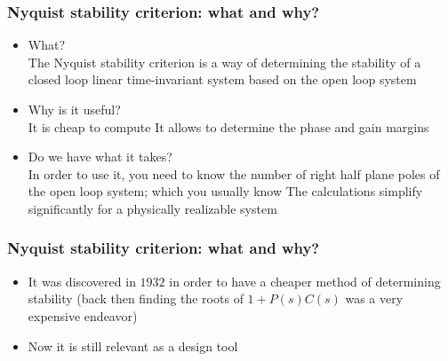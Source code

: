 \begin{frame}
\frametitle{Nyquist stability criterion: what and why?}
\begin{itemize}
\vspace{-0.25cm}
\item What?\\
\vspace{0.35cm}
The Nyquist stability criterion is a way of determining the stability of a closed loop linear time-invariant system based on the open loop system
\vspace{0.25cm}
\item Why is it useful?\\
\vspace{0.35cm}
It is cheap to compute
It allows to determine the phase and gain margins
\vspace{0.25cm}
\item Do we have what it takes?\\
\vspace{0.35cm}
In order to use it, you need to know the number of right half plane poles of the open loop system; which you usually know
The calculations simplify significantly for a physically realizable system
\end{itemize}
\end{frame}

\begin{frame}
\frametitle{Nyquist stability criterion: what and why?}
\begin{itemize}
\vspace{-1.5cm}
\item It was discovered in $1932$ in order to have a cheaper method of determining stability (back then finding the roots of $1+P(s)C(s)$ was a very expensive endeavor)\\
\vspace{2.5cm}
\item Now it is still relevant as a design tool
\end{itemize}
\end{frame}


